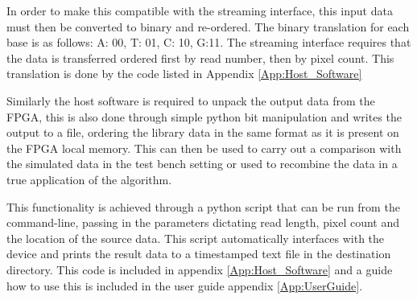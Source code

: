 In order to make this compatible with the streaming interface, this input data must then be converted to binary and re-ordered. The binary translation for each base is as follows: A: 00, T: 01, C: 10, G:11. The streaming interface requires that the data is transferred ordered first by read number, then by pixel count. This translation is done by the code listed in Appendix \ref{App:Host_Software}

Similarly the host software is required to unpack the output data from the FPGA, this is also done through simple python bit manipulation and writes the output to a file, ordering the library data in the same format as it is present on the FPGA local memory. This can then be used to carry out a comparison with the simulated data in the test bench setting or used to recombine the data in a true application of the algorithm. 

This functionality is achieved through a python script that can be run from the command-line, passing in the parameters dictating read length, pixel count and the location of the source data. This script automatically interfaces with the device and prints the result data to a timestamped text file in the destination directory. This code is included in appendix \ref{App:Host_Software} and a guide how to use this is included in the user guide appendix \ref{App:UserGuide}.
\vspace*{\fill}